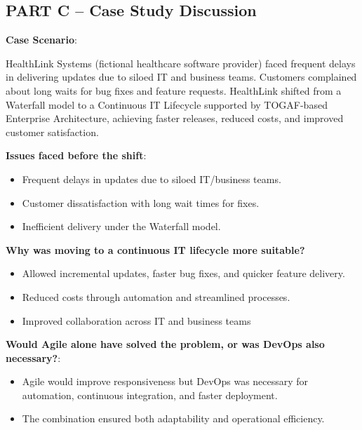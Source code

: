 \subsection{PART C – Case Study Discussion}

\indent 

\noindent\textbf{Case Scenario}:

HealthLink Systems (fictional healthcare software provider) faced frequent delays in delivering updates due to siloed IT and business teams. Customers complained about long waits for bug fixes and feature requests. HealthLink shifted from a Waterfall model to a Continuous IT Lifecycle supported by TOGAF-based Enterprise Architecture, achieving faster releases, reduced costs, and improved customer satisfaction.

\bigskip

\noindent\textbf{Issues faced before the shift}:

\begin{itemize}
    \item Frequent delays in updates due to siloed IT/business teams.
    \item Customer dissatisfaction with long wait times for fixes.
    \item Inefficient delivery under the Waterfall model.
\end{itemize}


\bigskip

\noindent\textbf{Why was moving to a continuous IT lifecycle more suitable?}


\begin{itemize}
    \item Allowed incremental updates, faster bug fixes, and quicker feature delivery.
    \item Reduced costs through automation and streamlined processes.
    \item Improved collaboration across IT and business teams
\end{itemize}


\bigskip

\noindent\textbf{Would Agile alone have solved the problem, or was DevOps also necessary?}:


\begin{itemize}
    \item Agile would improve responsiveness but DevOps was necessary for automation, continuous integration, and faster deployment.
    \item The combination ensured both adaptability and operational efficiency.
\end{itemize}


